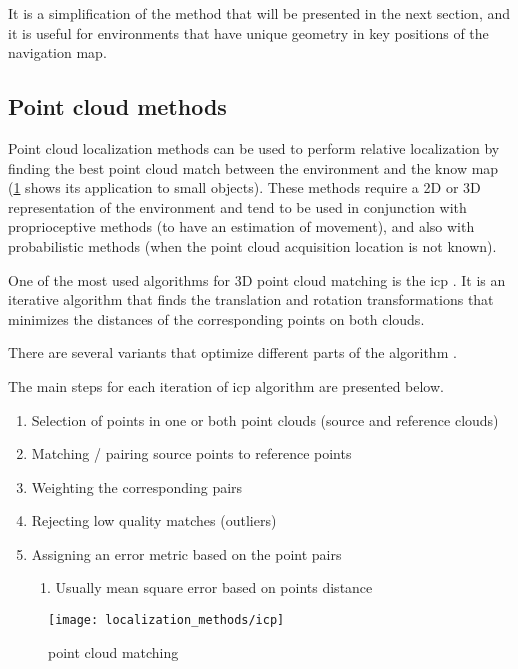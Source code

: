 It is a simplification of the method that will be presented in the next section, and it is useful for environments that have unique geometry in key positions of the navigation map.


\subsection{Point cloud methods}

Point cloud localization methods can be used to perform relative localization by finding the best point cloud match between the environment and the know map (\cref{fig:localization-methods_icp} shows its application to small objects). These methods require a 2D or 3D representation of the environment and tend to be used in conjunction with proprioceptive methods (to have an estimation of movement), and also with probabilistic methods (when the point cloud acquisition location is not known).

One of the most used algorithms for 3D point cloud matching is the \gls{icp} \cite{Besl1992,Jez2008,Zhang1992,Bouaziz2013,Chetverikov2002,Djehaich2013,Zhou2011}. It is an iterative algorithm that finds the translation and rotation transformations that minimizes the distances of the corresponding points on both clouds.

There are several variants that optimize different parts of the algorithm \cite{Rusinkiewicz2001}.

The main steps for each iteration of \gls{icp} algorithm are presented below.

\begin{enumerate}
	\item  Selection of points in one or both point clouds (source and reference clouds)
	\item  Matching / pairing source points to reference points
	\item  Weighting the corresponding pairs
	\item  Rejecting low quality matches (outliers)
	\item  Assigning an error metric based on the point pairs
	\begin{enumerate}
		\item  Usually mean square error based on points distance
	\end{enumerate}
\end{enumerate}


\begin{figure}[H]
	\centering
	\texttt{[image: localization\_methods/icp]}
	\caption[ point cloud matching]{ point cloud matching\protect\footnotemark}
	\label{fig:localization-methods_icp}
\end{figure}


